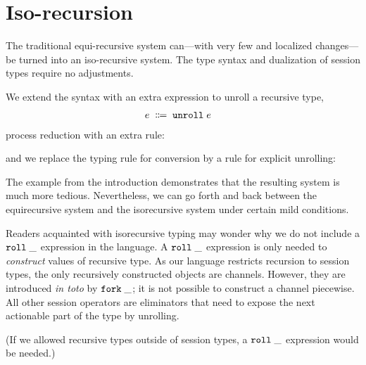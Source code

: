 \section{Iso-recursion}
\label{sec:iso-recursion}

The traditional equi-recursive system can---with very few and localized changes---be turned
into an iso-recursive system. The type syntax and dualization of
session types require no adjustments.

We extend the syntax with an extra expression to unroll a recursive
type,
\begin{align*}
    e \grmdef&
               \EUnroll e
\end{align*}
%
process reduction with an extra rule:
%
\begin{mathpar}
\end{mathpar}
%
and we replace the typing rule for conversion by a rule for explicit unrolling:
\begin{mathpar}
\end{mathpar}

The example from the introduction demonstrates that the resulting
system is much more tedious. Nevertheless, we can go forth and back
between the equirecursive system and the isorecursive system under
certain mild conditions.

Readers acquainted with isorecursive typing may wonder why we do not
include a $\ERoll\_$ expression in the language. A $\ERoll\_$
expression is only needed to \emph{construct} values of recursive
type. As our language restricts recursion to session types, the only
recursively constructed objects are channels. However, they are
introduced \emph{in toto} by $\EFork\_$; it is not possible to
construct a channel piecewise. All other session operators are
eliminators that need to expose the next actionable part of the type
by unrolling.

(If we allowed recursive types outside of session types, a
$\ERoll\_$ expression would be needed.)




